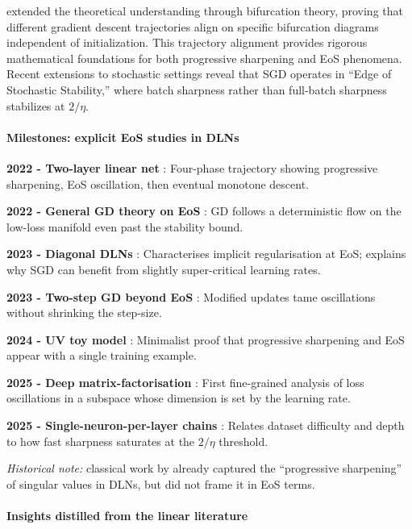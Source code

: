 \documentclass[11pt]{article}
\begin{document}
\citet{song2023trajectory} extended the theoretical understanding through bifurcation theory, proving that different gradient descent trajectories align on specific bifurcation diagrams independent of initialization. This trajectory alignment provides rigorous mathematical foundations for both progressive sharpening and EoS phenomena. Recent extensions to stochastic settings reveal that SGD operates in ``Edge of Stochastic Stability,'' where batch sharpness rather than full-batch sharpness stabilizes at $2/\eta$.

\paragraph{Milestones: explicit EoS studies in DLNs}

\textbf{2022 - Two-layer linear net} \citep{Li2022SharpnessEoS}: Four-phase trajectory showing progressive sharpening, EoS oscillation, then eventual monotone descent.

\textbf{2022 - General GD theory on EoS} \citep{Arora2022Understanding}: GD follows a deterministic flow on the low-loss manifold even past the stability bound.

\textbf{2023 - Diagonal DLNs} \citep{Labarriere2024DiagonalDLN}: Characterises implicit regularisation at EoS; explains why SGD can benefit from slightly super-critical learning rates.

\textbf{2023 - Two-step GD beyond EoS} \citep{Chen2023TwoStep}: Modified updates tame oscillations without shrinking the step-size.

\textbf{2024 - UV toy model} \citep{Kalra2023Universal}: Minimalist proof that progressive sharpening and EoS appear with a single training example.

\textbf{2025 - Deep matrix-factorisation} \citep{Ghosh2025DeepMF}: First fine-grained analysis of loss oscillations in a subspace whose dimension is set by the learning rate.

\textbf{2025 - Single-neuron-per-layer chains} \citep{Yoo2025SingleNeuron}: Relates dataset difficulty and depth to how fast sharpness saturates at the $2/\eta$ threshold.

\vspace{0.5em}
\noindent
\emph{Historical note:} classical work by \citet{saxe2013exact} already
captured the ``progressive sharpening'' of singular values in DLNs, but
did not frame it in EoS terms.

\paragraph{Insights distilled from the linear literature}
\end{document}
